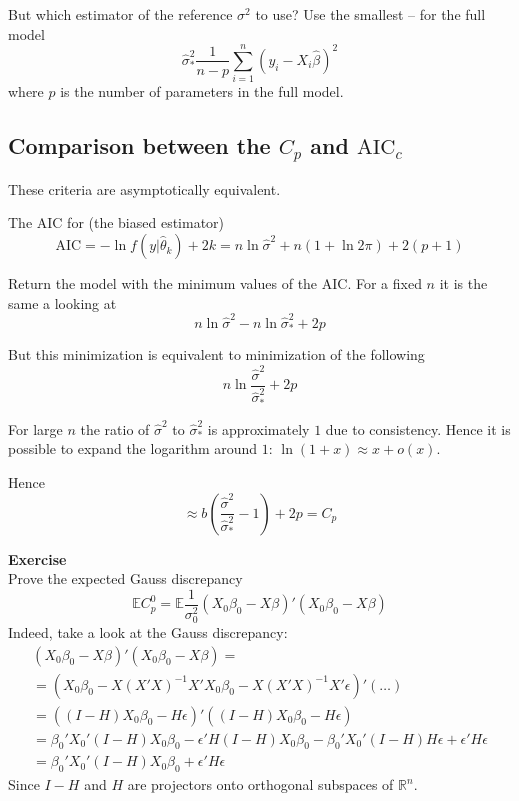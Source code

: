 \documentclass[a4paper]{article}
\newcommand{\brac}[1]{{\left ( #1 \right )}}
\newcommand{\induc}[1]{{\left . #1 \right \vert}}
\newcommand{\Real}{\mathbb{R}}
\newcommand{\Ex}[0]{{\mathbb{E}}}
\begin{document}
But which estimator of the reference $\sigma^2$ to use? Use the smallest -- for the full model
\[\hat{\sigma}^2_*\frac{1}{n-p} \sum_{i=1}^n\brac{y_i - X_i\hat{\beta}}^2\]
where $p$ is the number of parameters in the full model.


\subsection{Comparison between the $C_p$ and $\text{AIC}_c$} %
\label{sub:comparison_between_cp_and_aicc}

These criteria are asymptotically equivalent.

The AIC for (the biased estimator)
\[\text{AIC} = - \ln f\brac{\induc{y}\hat{\theta}_k} + 2k 
	= n \ln \hat{\sigma}^2 + n\brac{1 + \ln 2\pi} + 2(p+1)\]

Return the model with the minimum values of the AIC. For a fixed $n$ it is the same a looking at 
\[n\ln \hat{\sigma}^2 - n\ln \hat{\sigma}^2_* + 2 p \]

But this minimization is equivalent to minimization of the following 
\[ n\ln \frac{\hat{\sigma}^2}{\hat{\sigma}^2_*} + 2p\]

For large $n$ the ratio of $\hat{\sigma}^2$ to $\hat{\sigma}^2_*$ is approximately $1$ due to consistency.
Hence it is possible to expand the logarithm around $1$: $\ln(1+x)\approx x + o(x)$.

Hence
\[\approx b\brac{\frac{\hat{\sigma}^2}{\hat{\sigma}^2_*} - 1} + 2p = C_p\]

\textbf{Exercise}\\
Prove the expected Gauss discrepancy
\[\Ex C_p^0 = \Ex \frac{1}{\sigma^2_0}\brac{X_0\beta_0 -X \beta}'\brac{X_0\beta_0 -X \beta}\]
Indeed, take a look at the Gauss discrepancy:
\begin{multline*}
	\brac{X_0\beta_0 -X \beta}'\brac{X_0\beta_0 -X \beta} = \\
	= \brac{X_0\beta_0 - X \brac{X'X}^{-1}X'X_0\beta_0 - X \brac{X'X}^{-1}X'\epsilon }'\brac{ \ldots }\\
	= \brac{ (I - H )X_0\beta_0 - H \epsilon }'\brac{ (I - H )X_0\beta_0 - H \epsilon }\\
	= \beta_0'X_0'(I-H)X_0\beta_0 - \epsilon'H(I-H)X_0\beta_0 - \beta_0'X_0'(I-H)H \epsilon + \epsilon'H\epsilon\\
	= \beta_0'X_0'(I-H)X_0\beta_0 + \epsilon'H\epsilon
\end{multline*}
Since $I-H$ and $H$ are projectors onto orthogonal subspaces of $\Real^n$.
\end{document}
